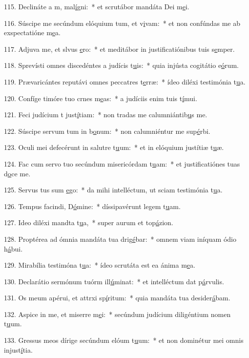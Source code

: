 115. Declináte a m, mal\uline{í}gni:~* et scrutábor mandáta Dei m\uline{e}i.\par 
116. Súscipe me secúndum elóquium tum, et v\uline{i}vam:~* et non confúndas me ab exspectatióne m\uline{e}a.\par 
117. Adjuva me, et slvus \uline{e}ro:~* et meditábor in justificatiónibus tuis s\uline{e}mper.\par 
118. Sprevísti omnes discedéntes a judícis t\uline{u}is:~* quia injústa cogitátio e\uline{ó}rum.\par 
119. Prævaricántes reputávi omnes peccatres t\uline{e}rræ:~* ídeo diléxi testimónia t\uline{u}a.\par 
120. Confíge timóre tuo crnes m\uline{e}as:~* a judíciis enim tuis t\uline{í}mui.\par 
121. Feci judícium t just\uline{í}tiam:~* non tradas me calumniántib\uline{u}s me.\par 
122. Súscipe servum tum in b\uline{o}num:~* non calumniéntur me sup\uline{é}rbi.\par 
123. Oculi mei defecérunt in salutre t\uline{u}um:~* et in elóquium justítiæ t\uline{u}æ.\par 
124. Fac cum servo tuo secúndum misericórdam t\uline{u}am:~* et justificatiónes tuas d\uline{o}ce me.\par 
125. Servus tus sum \uline{e}go:~* da mihi intelléctum, ut sciam testimónia t\uline{u}a.\par 
126. Tempus facindi, D\uline{ó}mine:~* díssipavérunt legem t\uline{u}am.\par 
127. Ideo diléxi mandta t\uline{u}a,~* super aurum et top\uline{á}zion.\par 
128. Proptérea ad ómnia mandáta tua drig\uline{é}bar:~* omnem viam iníquam ódio h\uline{á}bui.\par 
129. Mirabília testimóna t\uline{u}a:~* ídeo scrutáta est ea ánima m\uline{e}a.\par 
130. Declarátio sermónum tuórm ill\uline{ú}minat:~* et intelléctum dat p\uline{á}rvulis.\par 
131. Os meum apérui, et attrxi sp\uline{í}ritum:~* quia mandáta tua desider\uline{á}bam.\par 
132. Aspice in me, et miserre m\uline{e}i:~* secúndum judícium diligéntium nomen t\uline{u}um.\par 
133. Gressus meos dírige secúndum elóum t\uline{u}um:~* et non dominétur mei omnis injust\uline{í}tia.\par 
